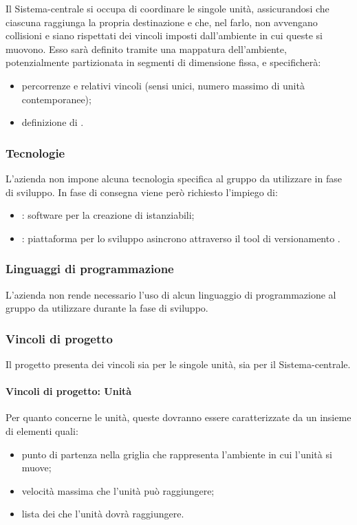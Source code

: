 \documentclass[]{article}
\begin{document}
			Il Sistema-centrale si occupa di coordinare le singole unità, assicurandosi che ciascuna raggiunga la propria destinazione e che, nel farlo, non avvengano collisioni e siano rispettati dei vincoli imposti dall'ambiente in cui queste si muovono.
			Esso sarà definito tramite una mappatura dell'ambiente, potenzialmente partizionata in segmenti di dimensione fissa, e specificherà:
			\begin{itemize}
				\item percorrenze e relativi vincoli (sensi unici, numero massimo di unità contemporanee);
				\item definizione di .
			\end{itemize}

			\subsubsection{Tecnologie}
			L'azienda non impone alcuna tecnologia specifica al gruppo da utilizzare in fase di sviluppo.
			In fase di consegna viene però richiesto l'impiego di:
			\begin{itemize}
				\item \textsc{}: software per la creazione di  istanziabili;
				\item \textsc{}: piattaforma per lo sviluppo asincrono attraverso il tool di versionamento .
			\end{itemize}

			\subsubsection{Linguaggi di programmazione}
			L'azienda non rende necessario l'uso di alcun linguaggio di programmazione al gruppo da utilizzare durante la fase di sviluppo.

			\subsubsection{Vincoli di progetto}
			Il progetto presenta dei vincoli sia per le singole unità, sia per il Sistema-centrale.

			\paragraph{Vincoli di progetto: Unità}
			Per quanto concerne le unità, queste dovranno essere caratterizzate da un insieme di elementi quali:
			\begin{itemize}
				\item punto di partenza nella griglia che rappresenta l'ambiente in cui l'unità si muove;
				\item velocità massima che l'unità può raggiungere;
				\item lista dei  che l'unità dovrà raggiungere.
			\end{itemize}
\end{document}
